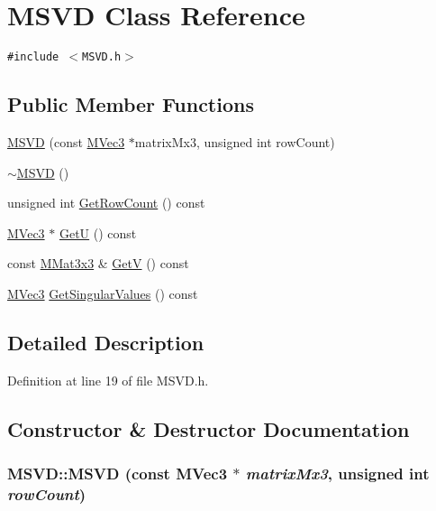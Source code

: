 \hypertarget{class_m_s_v_d}{
\section{MSVD Class Reference}
\label{class_m_s_v_d}
}
{\tt \#include $<$MSVD.h$>$}

\subsection*{Public Member Functions}
\begin{CompactItemize}
\item 
\hyperlink{class_m_s_v_d_893f986e1358d9f2ee6eba2c0cfa130b}{MSVD} (const \hyperlink{class_m_vec3}{MVec3} $\ast$matrixMx3, unsigned int rowCount)
\item 
\hyperlink{class_m_s_v_d_5a285d1e3c1b798b6028c6af60bf57bf}{$\sim$MSVD} ()
\item 
unsigned int \hyperlink{class_m_s_v_d_fa55a5805b169af65ca66ee6703fffbe}{GetRowCount} () const 
\item 
\hyperlink{class_m_vec3}{MVec3} $\ast$ \hyperlink{class_m_s_v_d_45fa81afbfc64857e14e6378237f7f18}{GetU} () const 
\item 
const \hyperlink{class_m_mat3x3}{MMat3x3} \& \hyperlink{class_m_s_v_d_3b8af7f2557b0b17332ed157e280127a}{GetV} () const 
\item 
\hyperlink{class_m_vec3}{MVec3} \hyperlink{class_m_s_v_d_8b52a085ef301a2c754c4dbe425f6a2b}{GetSingularValues} () const 
\end{CompactItemize}


\subsection{Detailed Description}


Definition at line 19 of file MSVD.h.

\subsection{Constructor \& Destructor Documentation}
\hypertarget{class_m_s_v_d_893f986e1358d9f2ee6eba2c0cfa130b}{
\subsubsection[{MSVD}]{\setlength{\rightskip}{0pt plus 5cm}MSVD::MSVD (const {\bf MVec3} $\ast$ {\em matrixMx3}, \/  unsigned int {\em rowCount})}}
\label{class_m_s_v_d_893f986e1358d9f2ee6eba2c0cfa130b}





